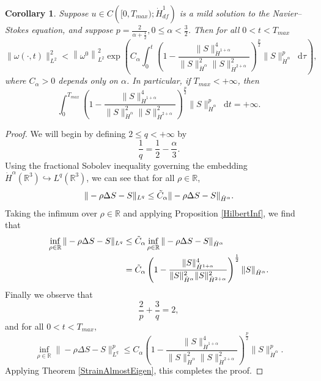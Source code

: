 \documentclass[11pt]{article}
\theoremstyle{plain}
\newtheorem{corollary}[theorem]{Corollary}
\theoremstyle{remark}
\numberwithin{equation}{section}
\newcommand{\diff}{\mathop{}\!\mathrm{d}}
\begin{document}
\begin{corollary} \label{StrainAlmostEigenHilbert}
Suppose $u\in C\left([0,T_{max});\dot{H}^1_{df}\right)$
is a mild solution to the Navier--Stokes equation,
and suppose $p=\frac{2}{\alpha+\frac{1}{2}},
0\leq \alpha <\frac{3}{2}$.
Then for all $0<t<T_{max}$
\begin{equation} 
    \|\omega(\cdot,t)\|_{L^2}^2
    <\left\|\omega^0\right\|_{L^2}^2
    \exp\left(C_\alpha \int_0^{t}
    \left(1-\frac{\|S\|_{\dot{H}^{1+\alpha}}^4}
    {\|S\|_{\dot{H}^\alpha}^2
    \| S\|_{\dot{H}^{2+\alpha}}^2}
    \right)^\frac{p}{2}
    \|S\|_{\dot{H}^\alpha}^p
    \diff\tau \right),
\end{equation}
where $C_\alpha>0$ depends only on $\alpha$.
In particular, if $T_{max}<+\infty$, then
\begin{equation}
    \int_0^{T_{max}}
    \left(1-\frac{\|S\|_{\dot{H}^{1+\alpha}}^4}
    {\|S\|_{\dot{H}^\alpha}^2
    \| S\|_{\dot{H}^{2+\alpha}}^2}
    \right)^\frac{p}{2}
    \|S\|_{\dot{H}^\alpha}^p
    \diff t
    =+\infty.
\end{equation}
\end{corollary}


\begin{proof}
We will begin by defining $2\leq q<+\infty$ by
\begin{equation}
    \frac{1}{q}=\frac{1}{2}-\frac{\alpha}{3}.
\end{equation}
Using the fractional Sobolev inequality governing the embedding
$\dot{H}^\alpha\left(\mathbb{R}^3\right)
\hookrightarrow L^q\left(\mathbb{R}^3\right)$,
we can see that for all $\rho\in \mathbb{R}$,
\begin{equation}
    \|-\rho\Delta S-S\|_{L^q}
    \leq 
    \Tilde{C}_\alpha
    \|-\rho\Delta S-S\|_{\dot{H}^\alpha}.
\end{equation}
Taking the infimum over $\rho\in\mathbb{R}$
and applying Proposition \ref{HilbertInf}, we find that
\begin{align}
    \inf_{\rho\in\mathbb{R}}
    \|-\rho\Delta S-S\|_{L^q}
    &\leq 
    \Tilde{C}_\alpha
    \inf_{\rho\in\mathbb{R}}
    \|-\rho\Delta S-S\|_{\dot{H}^\alpha} \\
    &=
    \Tilde{C}_\alpha
    \left(1-\frac{\|S\|_{\dot{H}^{1+\alpha}}^4}
    {\|S\|_{\dot{H}^\alpha}^2
    \| S\|_{\dot{H}^{2+\alpha}}^2}
    \right)^\frac{1}{2}
    \|S\|_{\dot{H}^\alpha}.
\end{align}
Finally we observe that
\begin{equation}
    \frac{2}{p}+\frac{3}{q}=2,
\end{equation}
and for all $0<t<T_{max},$
\begin{equation}
    \inf_{\rho\in\mathbb{R}}
    \|-\rho\Delta S-S\|_{L^q}^p
    \leq
    C_\alpha
    \left(1-\frac{\|S\|_{\dot{H}^{1+\alpha}}^4}
    {\|S\|_{\dot{H}^\alpha}^2
    \| S\|_{\dot{H}^{2+\alpha}}^2}
    \right)^\frac{p}{2}
    \|S\|_{\dot{H}^\alpha}^p.
\end{equation}
Applying Theorem \ref{StrainAlmostEigen},
this completes the proof.
\end{proof}
\end{document}
